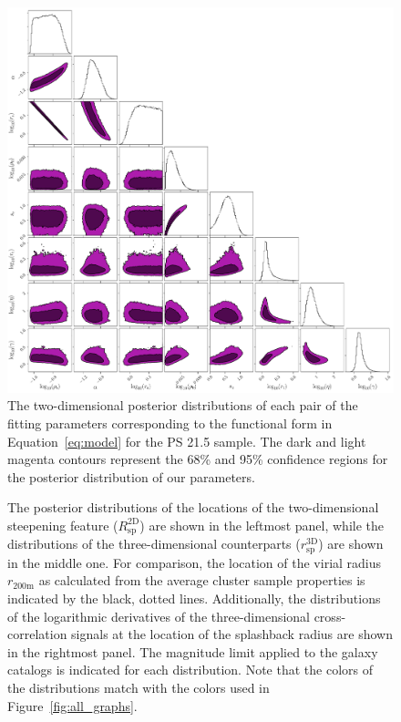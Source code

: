 \documentclass[iop, apjl, twocolappendix, numberedappendix]{emulateapj}
\begin{document}
\begin{figure}
    \includegraphics[width= \textwidth]{corner215.pdf}
\caption{The two-dimensional posterior distributions of each pair of
the fitting parameters corresponding to the functional form in
Equation~\ref{eq:model} for the PS 21.5 sample. The dark and light magenta
contours represent the 68\% and 95\% confidence regions for the posterior
distribution of our parameters.
}
   \label{fig:corner_21.5}
\end{figure}

\begin{figure}
\caption{The posterior distributions of the
locations of the two-dimensional steepening feature
($R_{\mathrm{sp}}^{\mathrm{2D}}$) are shown in the leftmost panel, while the
distributions of the three-dimensional counterparts
($r_{\mathrm{sp}}^{\mathrm{3D}}$) are shown in the middle one.
For comparison, the location of the virial
radius $r_{\mathrm{200m}}$ as calculated from the average cluster
sample properties is indicated by the black, dotted lines.
Additionally, the distributions of the logarithmic derivatives of
the three-dimensional cross-correlation signals at the location of
the splashback radius are shown in the rightmost panel.
The magnitude limit applied to the galaxy catalogs is indicated for each
distribution. Note that the colors of the distributions match with
the colors used in Figure~\ref{fig:all_graphs}. }
   \label{fig:histograms}
\end{figure}
\end{document}
